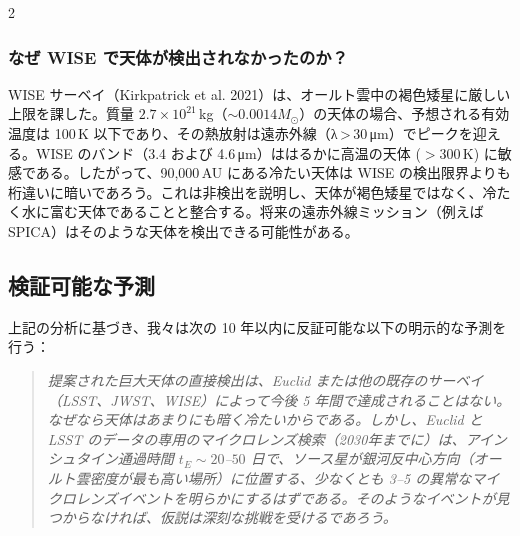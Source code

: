 \documentclass[12pt,a4paper]{article}
\begin{document}
\begin{multicols}{2}
		\subsubsection{なぜ WISE で天体が検出されなかったのか？}
		WISE サーベイ（Kirkpatrick et al. 2021）は、オールト雲中の褐色矮星に厳しい上限を課した。質量 \(2.7\times10^{21}\) kg（\(\sim 0.0014 M_{\odot}\)）の天体の場合、予想される有効温度は 100 K 以下であり、その熱放射は遠赤外線（λ > 30 μm）でピークを迎える。WISE のバンド（3.4 および 4.6 μm）ははるかに高温の天体 (\(>300\) K) に敏感である。したがって、90,000 AU にある冷たい天体は WISE の検出限界よりも桁違いに暗いであろう。これは非検出を説明し、天体が褐色矮星ではなく、冷たく水に富む天体であることと整合する。将来の遠赤外線ミッション（例えば SPICA）はそのような天体を検出できる可能性がある。
		
		\subsection{検証可能な予測}
		上記の分析に基づき、我々は次の 10 年以内に反証可能な以下の明示的な予測を行う：
		\begin{quote}
			\itshape
			提案された巨大天体の直接検出は、Euclid または他の既存のサーベイ（LSST、JWST、WISE）によって今後 5 年間で達成されることはない。なぜなら天体はあまりにも暗く冷たいからである。しかし、Euclid と LSST のデータの専用のマイクロレンズ検索（2030年までに）は、アインシュタイン通過時間 \(t_E \sim 20\)–\(50\) 日で、ソース星が銀河反中心方向（オールト雲密度が最も高い場所）に位置する、少なくとも 3–5 の異常なマイクロレンズイベントを明らかにするはずである。そのようなイベントが見つからなければ、仮説は深刻な挑戦を受けるであろう。
		\end{quote}
		
	\end{multicols}
	
\end{document}
